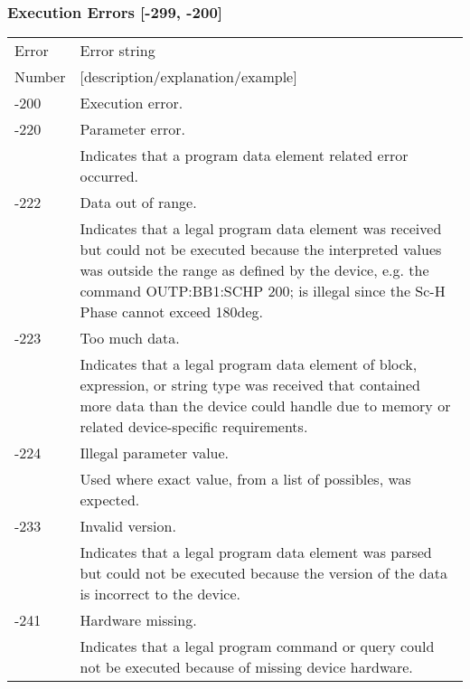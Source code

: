 \subsubsection{Execution Errors [-299, -200]}
\begin{longtable}{|l|p{25em}|}
\hline
Error			& Error string \\ 
Number		& [description/explanation/example] \\ \hline
-200			& Execution error.\\ \hline
-220			& Parameter error.\\ \cline{2-2}
					& Indicates that a program data element related error occurred.\\ \hline
-222			& Data out of range.\\ \cline{2-2}
					& Indicates that a legal program data element was received but could not be executed because the interpreted values was outside the range as defined by the device, e.g. the command OUTP:BB1:SCHP 200; is illegal since the Sc-H Phase cannot exceed 180deg.\\ \hline
-223			& Too much data.\\ \cline{2-2}
					& Indicates that a legal program data element of block, expression, or string type was received that contained more data than the device could handle due to memory or related device-specific requirements.\\ \hline
-224			& Illegal parameter value.\\ \cline{2-2}
					& Used where exact value, from a list of possibles, was expected.\\ \hline
-233			& Invalid version.\\ \cline{2-2}
					& Indicates that a legal program data element was parsed but could not be executed because the version of the data is incorrect to the device.\\ \hline
-241			& Hardware missing.\\ \cline{2-2}
					& Indicates that a legal program command or query could not be executed because of missing device hardware.\\ \hline
\end{longtable}

